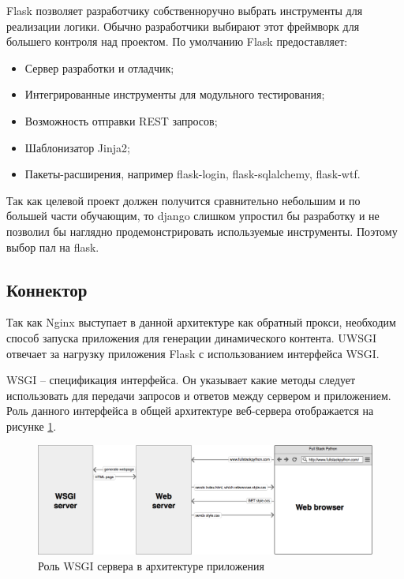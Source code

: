Flask позволяет разработчику собственноручно выбрать инструменты для реализации
логики. Обычно разработчики выбирают этот фреймворк для большего контроля над
проектом. По умолчанию Flask предоставляет:
\begin{itemize}
    \item Сервер разработки и отладчик;
    \item Интегрированные инструменты для модульного тестирования;
    \item Возможность отправки REST запросов;
    \item Шаблонизатор Jinja2;
    \item Пакеты-расширения, например flask-login, flask-sqlalchemy, flask-wtf.
\end{itemize}

Так как целевой проект должен получится сравнительно небольшим и по большей
части обучающим, то django слишком упростил бы разработку и не позволил бы
наглядно продемонстрировать используемые инструменты. Поэтому выбор пал на
flask.

\subsection{Коннектор}
Так как Nginx выступает в данной архитектуре как обратный прокси, необходим
способ запуска приложения для генерации динамического контента. UWSGI отвечает
за нагрузку приложения Flask с использованием интерфейса WSGI.

WSGI -- спецификация интерфейса. Он указывает какие методы следует использовать
для передачи запросов и ответов между сервером и приложением. Роль данного
интерфейса в общей архитектуре веб-сервера отображается на рисунке
\ref{fig:wsgi-web}.
\begin{figure}[H]
    \centering
    \includegraphics[scale=0.35]{inc/img/web-browser-server-wsgi.png}
    \caption{Роль WSGI сервера в архитектуре приложения}
    \label{fig:wsgi-web}
\end{figure}

